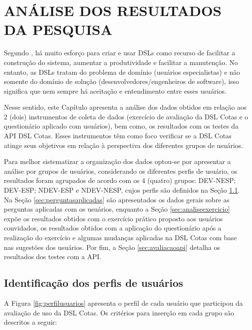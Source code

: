 \chapter{ANÁLISE DOS RESULTADOS DA  PESQUISA}
\label{chap:analise}

Segundo , há muito esforço para criar e usar \gls{DSL}s como recurso de facilitar a construção do sistema, aumentar a produtividade e facilitar a manutenção. No entanto, as \gls{DSL}s tratam do problema de domínio (usuários especialistas) e não somente do domínio de solução (desenvolvedores/engenheiros de software), isso significa que nem sempre há aceitação e entendimento entre esses usuários.

Nesse sentido, este Capítulo apresenta a análise dos dados obtidos em relação aos 2 (dois) instrumentos de coleta de dados (exercício de avaliação da DSL Cotas e o questionário aplicado com usuários), bem como, os resultados com os testes da API DSL Cotas. Esses instrumentos têm como foco verificar se a DSL Cotas atinge seus objetivos em relação à perspectiva dos diferentes grupos de usuários. 

Para melhor sistematizar a organização dos dados optou-se por apresentar a análise por grupos de usuários, considerando os diferentes perfis de usuário, os resultados foram agrupados de acordo com os 4 (quatro) grupos:  DEV-NESP; DEV-ESP; NDEV-ESP e NDEV-NESP, cujos perfis são definidos na Seção \ref{sec:idperfis}. Na Seção \ref{sec:perguntasaplicadas} são apresentados os dados gerais sobre as perguntas aplicadas com os usuários, enquanto a Seção \ref{sec:analiseexercicio} expõe os resultados obtidos com o exercício prático proposto aos usuários convidados, os resultados obtidos com a aplicação do questionário após a realização do exercício e algumas mudanças aplicadas na DSL Cotas com base nas sugestões dos usuários. Por fim, a Seção \ref{sec:avaliacaoapi} detalha os resultados dos testes com a API.





\section{Identificação dos perfis de usuários}
\label{sec:idperfis}


A Figura \ref{fig:perfilusuarios} apresenta o perfil de cada usuário que participou da avaliação de uso da DSL Cotas. Os critérios para inserção em cada grupo são descritos a seguir:

